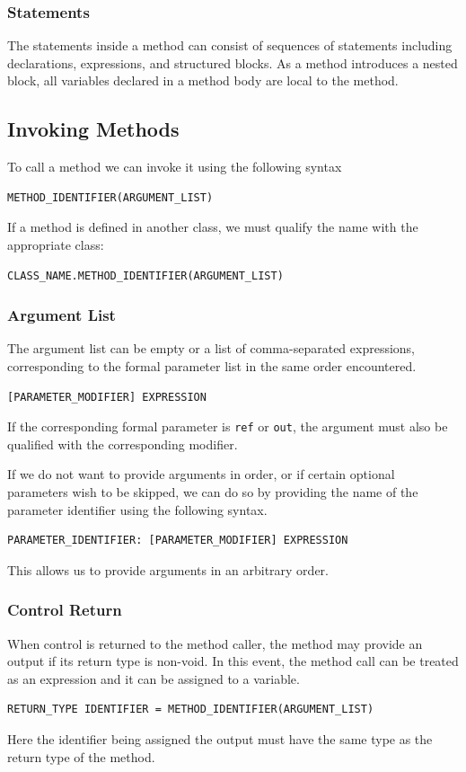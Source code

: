 \documentclass{article}
\begin{document}
\subsubsection{Statements}
The statements inside a method can consist of sequences of statements
including declarations, expressions, and structured blocks. As a method
introduces a nested block, all variables declared in a method body are
local to the method.
\subsection{Invoking Methods}
To call a method we can invoke it using the following syntax
\begin{verbatim}
METHOD_IDENTIFIER(ARGUMENT_LIST)
\end{verbatim}
If a method is defined in another class, we must qualify the name with
the appropriate class:
\begin{verbatim}
CLASS_NAME.METHOD_IDENTIFIER(ARGUMENT_LIST)
\end{verbatim}
\subsubsection{Argument List}
The argument list can be empty or a list of comma-separated
expressions, corresponding to the formal parameter list in the same
order encountered.
\begin{verbatim}
[PARAMETER_MODIFIER] EXPRESSION
\end{verbatim}
If the corresponding formal parameter is \texttt{ref} or
\texttt{out}, the argument must also be qualified with the
corresponding modifier.

If we do not want to provide arguments in order, or if certain optional
parameters wish to be skipped, we can do so by providing the name of
the parameter identifier using the following syntax.
\begin{verbatim}
PARAMETER_IDENTIFIER: [PARAMETER_MODIFIER] EXPRESSION
\end{verbatim}
This allows us to provide arguments in an arbitrary order.
\subsubsection{Control Return}
When control is returned to the method caller, the method may provide
an output if its return type is non-void. In this event, the method
call can be treated as an expression and it can be assigned to a
variable.
\begin{verbatim}
RETURN_TYPE IDENTIFIER = METHOD_IDENTIFIER(ARGUMENT_LIST)
\end{verbatim}
Here the identifier being assigned the output must have the same type
as the return type of the method.
\end{document}
